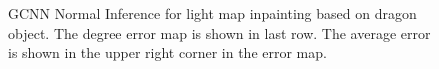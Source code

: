 \documentclass[border=15pt, multi, tikz]{article}
\begin{document}
\begin{figure}[H]
	
	\caption{GCNN Normal Inference for light map inpainting based on dragon object. The degree error map is shown in last row. The average error is shown in the upper right corner in the error map.}
	\label{fig:light-eval}
\end{figure}
\end{document}
